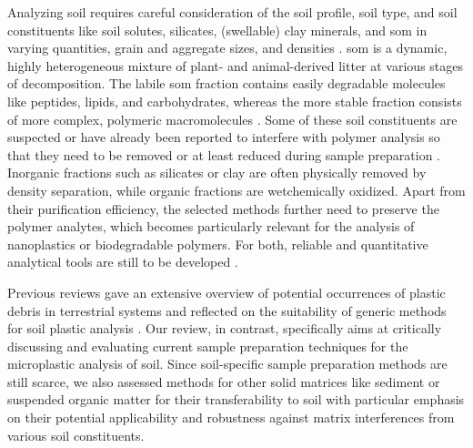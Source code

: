 Analyzing soil requires careful consideration of the soil profile, soil type, and soil constituents like soil solutes, silicates, (swellable) clay minerals, and \ac{som} in varying quantities, grain and aggregate sizes, and densities \citep{BlumeScheffer2016}.
\Ac{som} is a dynamic, highly heterogeneous mixture of plant- and animal-derived litter at various stages of decomposition. The labile \ac{som} fraction contains easily degradable molecules like peptides, lipids, and carbohydrates, whereas the more stable fraction consists of more complex, polymeric macromolecules \citep{BronickSoil2005}.
Some of these soil constituents are suspected or have already been reported to interfere with polymer analysis so that they need to be removed or at least reduced during sample preparation \citep[Chapter~\ref{ch:py-gc-ms-method};][]{LoderEnzymatic2017,FischerSimultaneous2017}. Inorganic fractions such as silicates or clay are often physically removed by density separation, while organic fractions are wetchemically oxidized.
Apart from their purification efficiency, the selected methods further need to preserve the polymer analytes, which becomes particularly relevant for the analysis of nanoplastics or biodegradable polymers. For both, reliable and quantitative analytical tools are still to be developed \citep{WangPoor2018,WahlNanoplastic2021}.

Previous reviews gave an extensive overview of potential occurrences of plastic debris in terrestrial systems \citep{HurleyFate2018,ZhuOccurrence2019,Dioses-SalinasMethodological2020,WuMicroplastics2020,MeixnerMicroplastic2020} and reflected on the suitability of generic methods for soil plastic analysis \citep{BlasingPlastics2018,MollerFinding2020}.
Our review, in contrast, specifically aims at critically discussing and evaluating current sample preparation techniques for the microplastic analysis of soil. Since soil-specific sample preparation methods are still scarce, we also assessed methods for other solid matrices like sediment or suspended organic matter for their transferability to soil with particular emphasis on their potential applicability and robustness against matrix interferences from various soil constituents.

